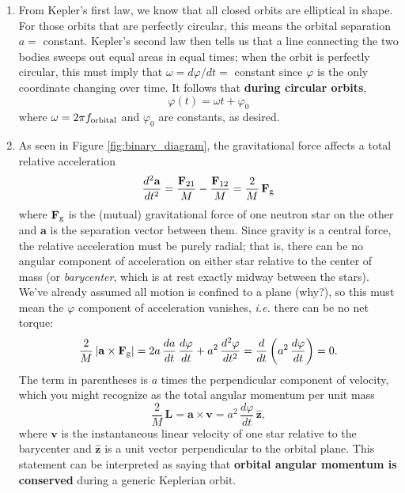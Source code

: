 \documentclass[11pt]{article}
\begin{document}
\begin{enumerate}

\item From Kepler's first law, we know that all closed orbits are elliptical in shape. For those orbits that are perfectly circular, this means the orbital separation $a =$ constant. Kepler's second law then tells us that a line connecting the two bodies sweeps out equal areas in equal times; when the orbit is perfectly circular, this must imply that $\omega = d\varphi/dt =$ constant since $\varphi$ is the only coordinate changing over time. It follows that \textbf{during circular orbits},
\begin{equation}
\varphi(t) = \omega t + \varphi_0
\end{equation}
where $\omega = 2\pi f_{\rm orbital}$ and $\varphi_0$ are constants, as desired.

\item As seen in Figure \ref{fig:binary_diagram}, the gravitational force affects a total relative acceleration \[ \frac{d^2\mathbf{a}}{dt^2} = \frac{\mathbf{F}_{\rm 21}}{M} - \frac{\mathbf{F}_{\rm 12}}{M} = \frac{2}{M}\,\mathbf{F}_{\rm g} \] where $\mathbf{F}_{\rm g}$ is the (mutual) gravitational force of one neutron star on the other and $\mathbf{a}$ is the separation vector between them. Since gravity is a central force, the relative acceleration must be purely radial; that is, there can be no angular component of acceleration on either star relative to the center of mass (or \textit{barycenter}, which is at rest exactly midway between the stars). We've already assumed all motion is confined to a plane (why?), so this must mean the $\varphi$ component of acceleration vanishes, \textit{i.e.} there can be no net torque: \[ \frac{2}{M}\,\vert\mathbf{a}\times\mathbf{F}_{\rm g}\vert = 2a\,\frac{da}{dt}\,\frac{d\varphi}{dt} + a^2\,\frac{d^2\varphi}{dt^2} = \frac{d}{dt} \left( a^2\,\frac{d\varphi}{dt} \right) = 0. \]
The term in parentheses is $a$ times the perpendicular component of velocity, which you might recognize as the total angular momentum per unit mass
\begin{equation}
\frac{2}{M}\, \mathbf{L} = \mathbf{a} \times \mathbf{v} = a^2\,\frac{d\varphi}{dt} \, \hat{\mathbf{z}},
\end{equation}
where $\mathbf{v}$ is the instantaneous linear velocity of one star relative to the barycenter and $\hat{\mathbf{z}}$ is a unit vector perpendicular to the orbital plane. This statement can be interpreted as saying that \textbf{orbital angular momentum is conserved} during a generic Keplerian orbit.


\end{enumerate}
\end{document}
